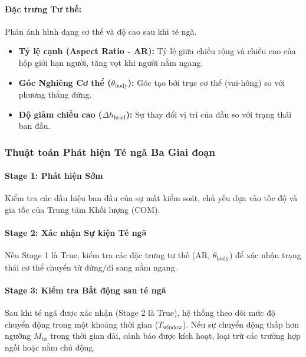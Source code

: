 \paragraph{Đặc trưng Tư thế:} Phản ánh hình dạng cơ thể và độ cao sau khi té ngã.
\begin{itemize}
    \item \textbf{Tỷ lệ cạnh (Aspect Ratio - AR):} Tỷ lệ giữa chiều rộng và chiều cao của hộp giới hạn người, tăng vọt khi người nằm ngang.
    \item \textbf{Góc Nghiêng Cơ thể ($\theta_{\text{body}}$):} Góc tạo bởi trục cơ thể (vai-hông) so với phương thẳng đứng.
    \item \textbf{Độ giảm chiều cao ($\Delta h_{\text{head}}$):} Sự thay đổi vị trí của đầu so với trạng thái ban đầu.
\end{itemize}

\subsubsection{Thuật toán Phát hiện Té ngã Ba Giai đoạn}

\paragraph{Stage 1: Phát hiện Sớm}
Kiểm tra các dấu hiệu ban đầu của sự mất kiểm soát, chủ yếu dựa vào tốc độ và gia tốc của Trung tâm Khối lượng (COM).

\paragraph{Stage 2: Xác nhận Sự kiện Té ngã}
Nếu Stage 1 là True, kiểm tra các đặc trưng tư thế (AR, $\theta_{\text{body}}$) để xác nhận trạng thái cơ thể chuyển từ đứng/đi sang nằm ngang.

\paragraph{Stage 3: Kiểm tra Bất động sau té ngã}
Sau khi té ngã được xác nhận (Stage 2 là True), hệ thống theo dõi mức độ chuyển động trong một khoảng thời gian ($T_{\text{window}}$). Nếu sự chuyển động thấp hơn ngưỡng $M_{th}$ trong thời gian dài, cảnh báo được kích hoạt, loại trừ các trường hợp ngồi hoặc nằm chủ động.
